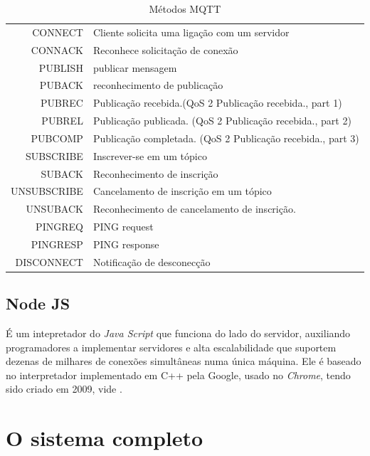 \documentclass[
	12pt,				%
	openright,			%
	twoside,			%
	a4paper,			%
	english,			%
	french,				%
	spanish,			%
	brazil				%
	]{abntex2}
\begin{document}
\begin{table}[h]
    \centering
    \begin{tabular}{ | r  l | } 
        \hline
            CONNECT & Cliente solicita uma ligação com um servidor \\
            CONNACK & Reconhece solicitação de conexão \\
            PUBLISH & publicar mensagem \\
            PUBACK & reconhecimento de publicação \\
            PUBREC & Publicação recebida.(QoS 2 Publicação recebida., part 1) \\
            PUBREL & Publicação publicada. (QoS 2 Publicação recebida., part 2) \\
            PUBCOMP & Publicação completada. (QoS 2 Publicação recebida., part 3) \\
            SUBSCRIBE & Inscrever-se em um tópico \\
            SUBACK & Reconhecimento de inscrição \\ 
            UNSUBSCRIBE & Cancelamento de inscrição em um tópico \\
            UNSUBACK & Reconhecimento de cancelamento de inscrição. \\
            PINGREQ & PING request \\
            PINGRESP & PING response \\
            DISCONNECT & Notificação de desconecção \\
        \hline
    \end{tabular}
    \caption{Métodos MQTT}
    \label{table:mqtt}
\end{table}

\section{Node JS}

É um intepretador do \textit{Java Script} que funciona do lado do servidor, auxiliando programadores a implementar servidores e alta escalabilidade que suportem dezenas de milhares de conexões simultâneas numa única máquina. Ele é baseado no interpretador implementado em C++ pela Google, usado no \textit{Chrome}, tendo sido criado em 2009, vide .

\chapter{O sistema completo}
\end{document}
